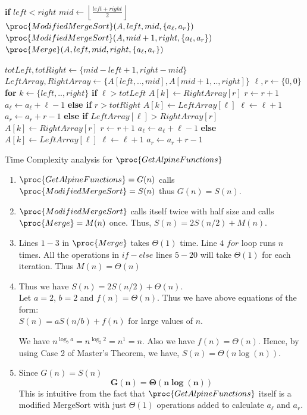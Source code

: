 \documentclass[11pt]{article}
\begin{document}
    \begin{codebox}
    \li \textbf{if} $left<right$
    \li \quad $mid \leftarrow \left\lfloor\frac{left+right}{2}\right\rfloor$
    \li \quad $\proc{ModifiedMergeSort}(A, left, mid, \{a_\ell, a_r\})$
    \li \quad $\proc{ModifiedMergeSort}(A, mid+1, right, \{a_\ell, a_r\})$
    \li \quad $\proc{Merge}(A, left, mid, right, \{a_\ell, a_r\})$
    \end{codebox}
    
    \begin{codebox}
    \li $totLeft, totRight \leftarrow \{mid-left+1, right-mid\}$
    \li $LeftArray, RightArray \leftarrow \{A[left, .. , mid], A[mid+1, .. , right]\}$
    \li $\ell, r \leftarrow \{0, 0\}$
    \li \textbf{for} $k\leftarrow \{left, .. , right\}$
    \li \quad \textbf{if} $\ell>totLeft$
    \li \quad \quad $A[k] \leftarrow RightArray[r]$
    \li \quad \quad $r \leftarrow r+1$
    \li \quad \quad $a_\ell \leftarrow a_\ell + \ell-1$
    \li \quad \textbf{else if} $r>totRight$
    \li \quad \quad $A[k] \leftarrow LeftArray[\ell]$
    \li \quad \quad $\ell \leftarrow \ell+1$
    \li \quad \quad $a_r \leftarrow a_r + r-1$
    \li \quad \textbf{else if} $LeftArray[\ell]>RightArray[r]$
    \li \quad \quad $A[k] \leftarrow RightArray[r]$
    \li \quad \quad $r \leftarrow r+1$
    \li \quad \quad $a_\ell \leftarrow a_\ell + \ell-1$
    \li \quad \textbf{else}
    \li \quad \quad $A[k] \leftarrow LeftArray[\ell]$
    \li \quad \quad $\ell \leftarrow \ell+1$
    \li \quad \quad $a_r \leftarrow a_r + r-1$
    \end{codebox}
\newpage
 Time Complexity analysis for $\proc{GetAlpineFunctions}$
 \begin{enumerate}
     \item $\proc{GetAlpineFunctions} = G(n)$ calls $\proc{ModifiedMergeSort} = S(n)$ thus $G(n) =  S(n)$.
     \item $\proc{ModifiedMergeSort}$ calls itself twice with half size and calls $\proc{Merge} = M(n)$ once. Thus, $S(n) = 2S(n/2)+M(n)$.
     \item Lines $1-3$ in $\proc{Merge}$ takes $\Theta(1)$ time. Line $4$ $for$ loop runs $n$ times. All the operations in $if-else$ lines $5-20$ will take $\Theta(1)$ for each iteration. Thus $M(n) = \Theta(n)$
     \item Thus we have $S(n) = 2S(n/2)+\Theta(n)$.\\
     Let $a = 2$, $b=2$ and $f(n) = \Theta(n)$. Thus we have above equations of the form:\\
     $S(n) = aS(n/b) + f(n)$ for large values of $n$.

    We have $n^{\log_b a} = n^{\log_{2} 2} = n^1 = n$. Also we have $f(n) = \Theta(n)$. 
    Hence, by using Case 2 of Master's Theorem, we have, $S(n) = \Theta(n\log(n))$.
    \item Since $G(n) = S(n)$
    $$\mathbf{G(n) = \Theta(n\log(n))}$$
    This is intuitive from the fact that $\proc{GetAlpineFunctions}$ itself is a modified MergeSort with just $\Theta(1)$ operations added to calculate $a_\ell$ and $a_r$.
 \end{enumerate}
\end{document}

